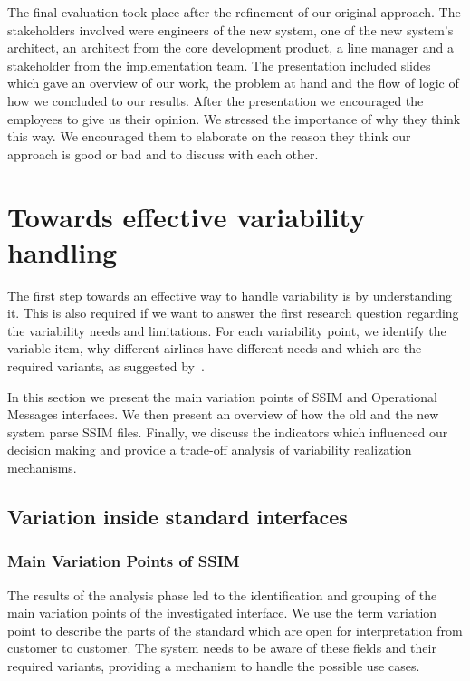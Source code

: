 The final evaluation took place after the refinement of our original approach. The stakeholders involved were engineers of the new system, one of the new system's architect, an architect from the core development product, a line manager and a stakeholder from the implementation team. The presentation included slides which gave an overview of our work, the problem at hand and the flow of logic of how we concluded to our results. After the presentation we encouraged the employees to give us their opinion. We stressed the importance of why they think this way. We encouraged them to elaborate on the reason they think our approach is good or bad and to discuss with each other.


\section{Towards effective variability handling}\label{sec:approach}


The first step towards an effective way to handle variability is by understanding it. This is also required if we want to answer the first research question regarding the variability needs and limitations. For each variability point, we identify the variable item, why different airlines have different needs and which are the required variants, as suggested by~\cite{Pohl2005}. %

In this section we present the main variation points of SSIM and Operational Messages interfaces. We then present an overview of how the old and the new system parse SSIM files. Finally, we discuss the indicators which influenced our decision making and provide a trade-off analysis of variability realization mechanisms.


\subsection{Variation inside standard interfaces}
\subsubsection{Main Variation Points of SSIM}

The results of the analysis phase led to the identification and grouping of the main variation points of the investigated interface. We use the term variation point to describe the parts of the standard which are open for interpretation from customer to customer. The system needs to be aware of these fields and their required variants, providing a mechanism to handle the possible use cases. 

